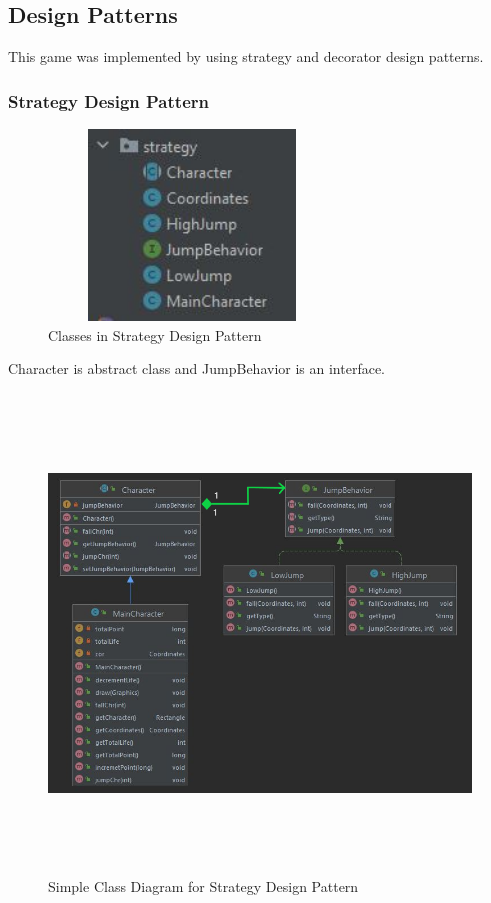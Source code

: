 \documentclass{article}
\begin{document}
\subsection{Design Patterns}
This game was implemented by using strategy and decorator design patterns.
\subsubsection{Strategy Design Pattern}
\begin{figure}[H]
    \centering
	\includegraphics[width=3in, height=2in]{t2.JPG}
	\caption[Optional caption]{Classes in Strategy Design Pattern}
	\label{}
\end{figure}
Character is abstract class and JumpBehavior is an interface. 
\begin{figure}[H]
    \centering
	\includegraphics[width=7in, height=5in]{t8.png}
	\caption[Optional caption]{Simple Class Diagram for Strategy Design Pattern}
	\label{}
\end{figure}
\end{document}
